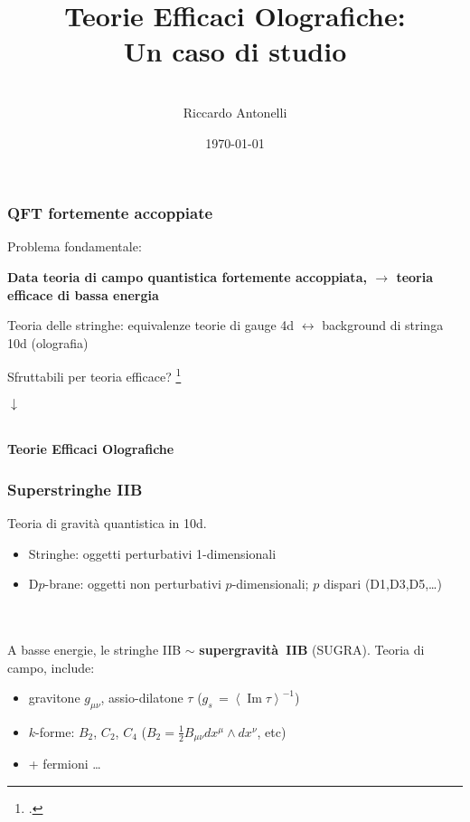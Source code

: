 \documentclass[aspectratio=43,mathserif]{beamer}
\title{Teorie Efficaci Olografiche:\\ Un caso di studio}
\author{\vspace{10pt}\\\large Riccardo Antonelli }
\date{\today}
\newcommand{\vev}[1]{\left\langle{#1}\right\rangle}
\renewcommand{\Im}{\ensuremath{\operatorname{Im}}}
\begin{document}
\begin{frame}
	\maketitle
\end{frame}

\begin{frame}
	\frametitle{QFT fortemente accoppiate}
	Problema fondamentale:
	\begin{center}\textbf{
		Data teoria di campo quantistica fortemente accoppiata, $\longrightarrow$ teoria efficace di bassa energia}
	\end{center}

	\vfill Teoria delle stringhe: equivalenze teorie di gauge 4d $\leftrightarrow$ background di stringa 10d (olografia)

	\vfill \begin{center}Sfruttabili per teoria efficace? \footcite{MZ}\end{center}

	\begin{center} $\downarrow$

		~\\

		\textbf{Teorie Efficaci Olografiche}
	\end{center}



\end{frame}

\begin{frame}
	\frametitle{Superstringhe IIB}
	Teoria di gravità quantistica in 10d.

	\begin{itemize}
		\item Stringhe: oggetti perturbativi 1-dimensionali
		\item D$p$-brane: oggetti non perturbativi $p$-dimensionali; $p$ dispari (D1,D3,D5,\ldots)
	\end{itemize}

	~\\~\\

	A basse energie, le stringhe IIB $\sim$ \textbf{supergravità~IIB} (SUGRA). Teoria di campo, include:

	\begin{itemize}
		\item gravitone $g_{\mu\nu}$, assio-dilatone $\tau$ \quad \quad (${g_s\, = \vev{\Im \tau}^{-1}}$)
		\item $k$-forme: $B_2$, $C_2$, $C_4$ \quad \quad (${\scriptstyle B_2 = \frac{1}{2} B_{\mu\nu} dx^\mu \wedge dx^\nu}$, etc)
		\item + fermioni \ldots
	\end{itemize}
\end{frame}
\end{document}
